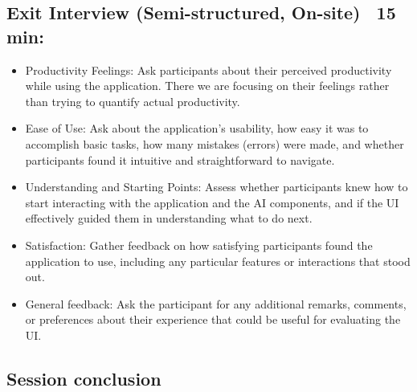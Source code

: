 \subsection{Exit Interview (Semi-structured, On-site) ~15 min:}
\begin{itemize}
    \item Productivity Feelings: Ask participants about their perceived productivity while using the application. There we are focusing on their feelings rather than trying to quantify actual productivity.
    \item Ease of Use: Ask about the application's usability, how easy it was to accomplish basic tasks, how many mistakes (errors) were made, and whether participants found it intuitive and straightforward to navigate.
    \item Understanding and Starting Points: Assess whether participants knew how to start interacting with the application and the AI components, and if the UI effectively guided them in understanding what to do next.
    \item Satisfaction: Gather feedback on how satisfying participants found the application to use, including any particular features or interactions that stood out.
    \item General feedback: Ask the participant for any additional remarks, comments, or preferences about their experience that could be useful for evaluating the UI.
\end{itemize}

\subsection{Session conclusion}